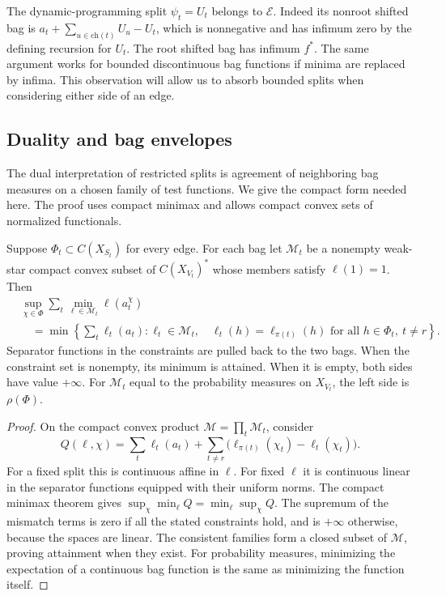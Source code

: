 The dynamic-programming split $\psi_t=U_t$ belongs to $\mathcal E$.
Indeed its nonroot shifted bag is
$a_t+\sum_{u\in\mathrm{ch}(t)}U_u-U_t$, which is nonnegative and has
infimum zero by the defining recursion for $U_t$.  The root shifted bag
has infimum $f^*$.  The same argument works for bounded discontinuous bag
functions if minima are replaced by infima.  This observation will allow
us to absorb bounded splits when considering either side of an edge.

\subsection{Duality and bag envelopes}

The dual interpretation of restricted splits is agreement of neighboring
bag measures on a chosen family of test functions.  We give the compact
form needed here. The proof uses compact minimax \citep{Sion1958} and
allows compact convex sets of normalized functionals.

\begin{theorem}
\label{thm:consistency-duality}
Suppose $\Phi_t\subset C(X_{S_t})$ for every edge.  For each bag let
$\mathcal M_t$ be a nonempty weak-star compact convex subset of
$C(X_{V_t})^*$ whose members satisfy $\ell(1)=1$.  Then
\begin{align}
\label{eq:consistency-duality}
 &\sup_{\chi\in\Phi}\sum_t\min_{\ell\in\mathcal M_t}\ell(a_t^\chi)
 \nonumber\\
 &\quad=
 \min\left\{\sum_t\ell_t(a_t):
 \ell_t\in\mathcal M_t,\quad
 \ell_t(h)=\ell_{\pi(t)}(h)
 \text{ for all }h\in\Phi_t,\ t\ne r\right\}.
\end{align}
Separator functions in the constraints are pulled back to the two bags.
When the constraint set is nonempty, its minimum is attained.  When it is
empty, both sides have value $+\infty$.
For $\mathcal M_t$ equal to the probability measures on $X_{V_t}$, the
left side is $\rho(\Phi)$.
\end{theorem}

\begin{proof}
On the compact convex product $\mathcal M=\prod_t\mathcal M_t$, consider
\[
 Q(\ell,\chi)=\sum_t\ell_t(a_t)
 +\sum_{t\ne r}\bigl(\ell_{\pi(t)}(\chi_t)-\ell_t(\chi_t)\bigr).
\]
For a fixed split this is continuous affine in $\ell$.  For fixed $\ell$
it is continuous linear in the separator functions equipped with their
uniform norms.  The compact minimax theorem gives
$\sup_\chi\min_\ell Q=\min_\ell\sup_\chi Q$.
The supremum of the mismatch terms is zero if all the stated constraints
hold, and is $+\infty$ otherwise, because the spaces are linear.
The consistent families form a closed subset of $\mathcal M$, proving
attainment when they exist.  For probability measures, minimizing the
expectation of a continuous bag function is the same as minimizing the
function itself.
\end{proof}

